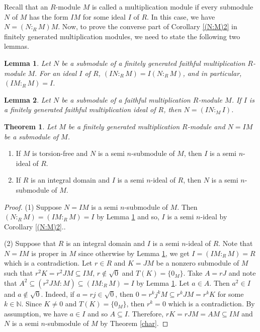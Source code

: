 \documentclass{amsart}%
\providecommand{\U}[1]{\protect\rule{.1in}{.1in}}
\newtheorem{theorem}{Theorem}
\theoremstyle{plain}
\newtheorem{lemma}{Lemma}
\numberwithin{equation}{section}
\begin{document}
Recall that an $R$-module $M$ is called a multiplication module if every
submodule $N$ of $M$ has the form $IM$ for some ideal $I$ of $R$. In this
case, we have $N=(N:_{R}M)M$. Now, to prove the converse part of Corollary
\ref{(N:M)2} in finitely generated multiplication modules, we need to state
the following two lemmas.

\begin{lemma}
\label{Smith}\cite{Smith} Let $N$ be a submodule of a finitely generated
faithful multiplication $R$-module $M.$ For an ideal $I$ of $R$,
$(IN:_{R}M)=I(N:_{R}M)$, and in particular, $(IM:_{R}M)=I$.
\end{lemma}

\begin{lemma}
\cite{Majed}\label{Majed} Let $N$ be a submodule of a faithful multiplication
$R$-module $M$. If $I$ is a finitely generated faithful multiplication ideal
of $R$, then $N=(IN:_{M}I)$.
\end{lemma}

\begin{theorem}
\label{IM}Let $M$ be a finitely generated multiplication $R$-module and $N=IM$
be a submodule of $M$.
\end{theorem}

\begin{enumerate}
\item If $M$ is torsion-free\textbf{ }and $N$ is a semi $n$-submodule of $M$,
then $I$ is a semi $n$-ideal of $R$.

\item If $R$ is an integral domain and $I$ is a semi $n$-ideal of $R$, then
$N$ is a semi $n$-submodule of $M$.
\end{enumerate}

\begin{proof}
(1) Suppose $N=IM$ is a semi $n$-submodule of $M$. Then $(N:_{R}%
M)=(IM:_{R}M)=I$ by Lemma \ref{Smith} and so, $I$ is a semi $n$-ideal by
Corollary \ref{(N:M)2}..

(2) Suppose that $R$ is an integral domain and $I$ is a semi $n$-ideal of $R$.
Note that $N=IM$ is proper in $M$ since otherwise by Lemma \ref{Smith}, we get
$I=(IM:_{R}M)=R$ which is a contradiction. Let $r\in R$ and $K=JM$ be a
nonzero submodule of $M$ such that $r^{2}K=r^{2}JM\subseteq IM$, $r\notin
\sqrt{0}$ and $T(K)=\{0_{M}\}.$ Take $A=rJ$ and note that $A^{2}%
\subseteq(r^{2}JM:M)\subseteq(IM:_{R}M)=I$ by Lemma \ref{Smith}. Let $a\in A$.
Then $a^{2}\in I$ and $a\notin\sqrt{0}$. Indeed, if $a=rj\in\sqrt{0}$, then
$0=r^{k}j^{k}M\subseteq r^{k}JM=r^{k}K$ for some $k\in%
\mathbb{N}
$. Since $K\neq0$ and $T(K)=\{0_{M}\}$, then $r^{k}=0$ which is a
contradiction. By assumption, we have $a\in I$ and so $A\subseteq I$.
Therefore, $rK=rJM=AM\subseteq IM$ and $N$ is a semi $n$-submodule of $M$ by
Theorem \ref{char}.
\end{proof}
\end{document}
